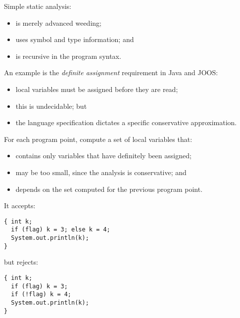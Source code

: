 \begin{slide*}
Simple static analysis:
\begin{itemize}
\item is merely advanced weeding;
\item uses symbol and type information; and
\item is recursive in the program syntax.
\end{itemize}
\vspace*{2em}

An example is the {\em definite assignment\/} requirement in Java and JOOS:
\begin{itemize}
\item local variables must be assigned before they are read;
\item this is undecidable; but
\item the language specification dictates a specific conservative approximation.
\end{itemize}
\vfil
\end{slide*}

\begin{slide*}
For each program point, compute a set of local variables that:
\begin{itemize}
\item contains only variables that have definitely been assigned;
\item may be too small, since the analysis is conservative; and
\item depends on the set computed for the previous program point.
\end{itemize}
\vspace*{2em}

It accepts:
\begin{scriptsize}
\begin{verbatim}
{ int k;
  if (flag) k = 3; else k = 4;
  System.out.println(k);
}
\end{verbatim}
\end{scriptsize}
but rejects:
\begin{scriptsize}
\begin{verbatim}
{ int k;
  if (flag) k = 3; 
  if (!flag) k = 4;
  System.out.println(k);
}
\end{verbatim}
\end{scriptsize}
\vfil
\end{slide*}

